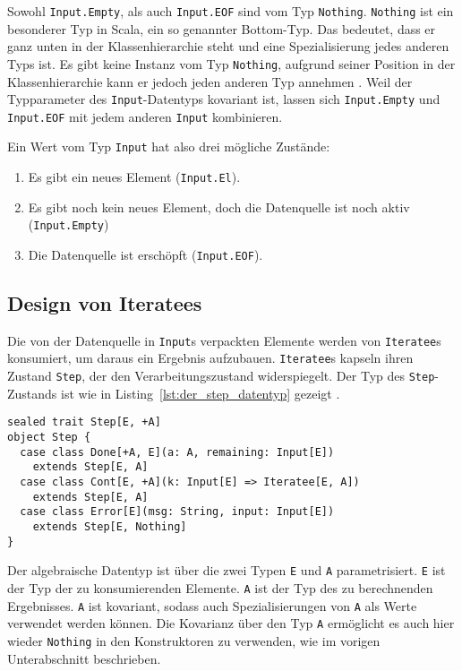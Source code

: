 Sowohl \lstinline|Input.Empty|, als auch \lstinline|Input.EOF| sind vom Typ \lstinline|Nothing|.
\lstinline|Nothing| ist ein besonderer Typ in Scala, ein so genannter Bottom-Typ.
Das bedeutet, dass er ganz unten in der Klassenhierarchie steht und eine Spezialisierung jedes anderen Typs ist.
Es gibt keine Instanz vom Typ \lstinline|Nothing|, aufgrund seiner Position in der Klassenhierarchie kann er jedoch jeden anderen Typ annehmen \cite[vgl.][S.~216]{programming_in_scala}.
Weil der Typparameter des \lstinline|Input|-Datentyps kovariant ist, lassen sich \lstinline|Input.Empty| und \lstinline|Input.EOF| mit jedem anderen \lstinline|Input| kombinieren.

Ein Wert vom Typ \lstinline|Input| hat also drei mögliche Zustände:
\begin{enumerate}
  \item Es gibt ein neues Element (\lstinline|Input.El|).
  \item Es gibt noch kein neues Element, doch die Datenquelle ist noch aktiv (\lstinline|Input.Empty|)
  \item Die Datenquelle ist erschöpft (\lstinline|Input.EOF|).
\end{enumerate}



\subsection{Design von Iteratees} %
\label{sub:design_iteratees}

Die von der Datenquelle in \lstinline|Input|s verpackten Elemente werden von \lstinline|Iteratee|s konsumiert, um daraus ein Ergebnis aufzubauen.
\lstinline|Iteratee|s kapseln ihren Zustand \lstinline|Step|, der den Verarbeitungszustand widerspiegelt.
Der Typ des \lstinline|Step|-Zustands ist wie in Listing~\ref{lst:der_step_datentyp} gezeigt \cite[vgl.][Z.~271]{play_iteratee_source_code}.
\begin{lstlisting}[caption=Der Step-Datentyp, label=lst:der_step_datentyp]
sealed trait Step[E, +A]
object Step {
  case class Done[+A, E](a: A, remaining: Input[E])
    extends Step[E, A]
  case class Cont[E, +A](k: Input[E] => Iteratee[E, A])
    extends Step[E, A]
  case class Error[E](msg: String, input: Input[E])
    extends Step[E, Nothing]
}
\end{lstlisting}

Der algebraische Datentyp ist über die zwei Typen \lstinline|E| und \lstinline|A| parametrisiert.
\lstinline|E| ist der Typ der zu konsumierenden Elemente.
\lstinline|A| ist der Typ des zu berechnenden Ergebnisses.
\lstinline|A| ist kovariant, sodass auch Spezialisierungen von \lstinline|A| als Werte verwendet werden können.
Die Kovarianz über den Typ \lstinline|A| ermöglicht es auch hier wieder \lstinline|Nothing| in den Konstruktoren zu verwenden, wie im vorigen Unterabschnitt beschrieben.

